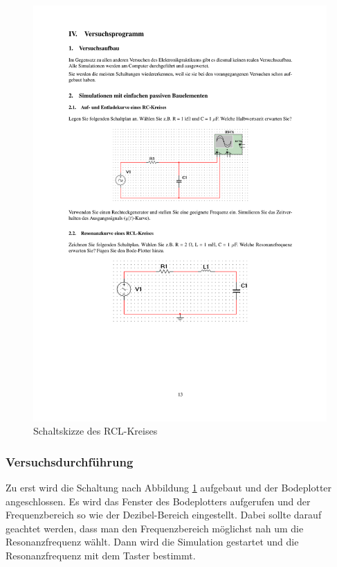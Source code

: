 \documentclass[12pt,a4paper]{article}
\begin{document}
\begin{figure}[H] 
  \centering
    \includegraphics[trim = 10mm 60mm 10mm 178mm, clip, scale = 1]{ep5_14[Page13].pdf}
  	\caption[Schaltskizze des RCL-Kreises]{Schaltskizze des RCL-Kreises\footnotemark}
  \label{fig:1_a_2}
\end{figure}

\subsubsection{Versuchsdurchführung}

Zu erst wird die Schaltung nach Abbildung \ref{fig:1_a_2} aufgebaut und der Bodeplotter angeschlossen. Es wird das Fenster des Bodeplotters aufgerufen und der Frequenzbereich so wie der Dezibel-Bereich eingestellt. Dabei sollte darauf geachtet werden, dass man den Frequenzbereich möglichst nah um die Resonanzfrequenz wählt. Dann wird die Simulation gestartet und die Resonanzfrequenz mit dem Taster bestimmt.
\end{document}
